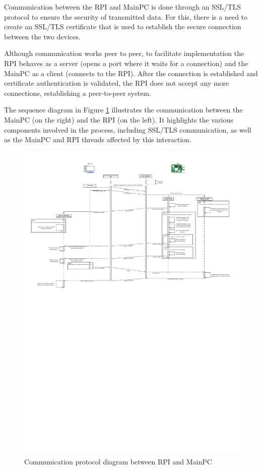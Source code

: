 Communication between the RPI and MainPC is done through an SSL/TLS protocol to ensure the security of transmitted data. For this, there is a need to create an SSL/TLS certificate that is used to establish the secure connection between the two devices.

Although communication works peer to peer, to facilitate implementation the RPI behaves as a server (opens a port where it waits for a connection) and the MainPC as a client (connects to the RPI). After the connection is established and certificate authentication is validated, the RPI does not accept any more connections, establishing a peer-to-peer system.

The sequence diagram in Figure \ref{fig:diagrama_comunicacao} illustrates the communication between the MainPC (on the right) and the RPI (on the left). It highlights the various components involved in the process, including SSL/TLS communication, as well as the MainPC and RPI threads affected by this interaction.
\begin{figure}[H]
    \centering
    \includegraphics[width=\textwidth, clip, trim=0 16cm 0 0]{figures/communication.pdf}
    \caption{Communication protocol diagram between RPI and MainPC}
    \label{fig:diagrama_comunicacao}
\end{figure}

